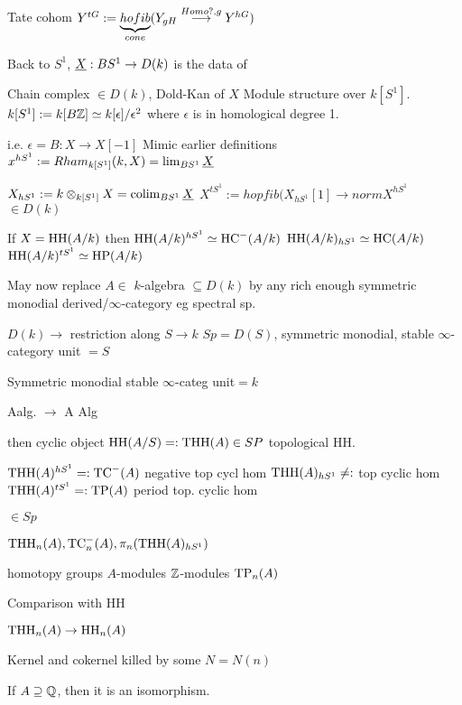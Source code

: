 Tate cohom
$Y^{tG}:= \underbrace{hofib}_{cone}(Y_{gH} \stackrel{Homo ?,g}{\longrightarrow} Y^{hG})$

Back to $S^1$, $\underline{X}: BS^1 \to D(k)$ is the data of 

Chain complex $\in D(k)$, Dold-Kan of $X$
Module structure over $k[S^1]$.
$k[S^1]:= k[B\mathbb{Z}] \simeq k[\epsilon]/\epsilon^2$
where $\epsilon$ is in homological degree 1.

i.e. $\epsilon=B: X \to X[-1]$
Mimic earlier definitions $x^{hS^1}:= Rham_{k[S^1]}(k,X) = \lim_{BS^1} \underline{X}$

$X_{hS^1}:= k \otimes_{k[S^1]} X= \operatorname{colim}_{BS^1} \underline{X}$
$X^{tS^1}:= hopfib(X_{hS^1}[1] \to norm X^{hS^1}$
$ \in D(k)$


If $X= \operatorname{HH}(A/k)$ then 
$\operatorname{HH}(A/k)^{hS^1} \simeq \operatorname{HC}^-(A/k)$
$\operatorname{HH}(A/k)_{hS^1} \simeq \operatorname{HC}(A/k)$
$\operatorname{HH}(A/k)^{tS^1} \simeq \operatorname{HP}(A/k)$

May now replace $A \in$ $k$-algebra $\subseteq D(k)$ by any rich enough symmetric monodial derived/$\infty$-category eg spectral sp.

$D(k) \to$ restriction along $S \to k$ $Sp=D(S)$, symmetric monodial, stable $\infty$-category unit $=S$

Symmetric monodial
stable $\infty$-categ
unit$=k$

Aalg. $\to$ A Alg


then cyclic object $\operatorname{HH}(A/S)=: \operatorname{THH}(A) \in SP$ topological HH. 

$\operatorname{THH}(A)^{hS^1}=: \operatorname{TC}^-(A)$ negative top cycl hom
$\operatorname{THH}(A)_{hS^1} \not=:$ top cyclic hom
$\operatorname{THH}(A)^{tS^1} =: \operatorname{TP}(A)$ period top. cyclic hom

$\in Sp$

$\operatorname{THH}_n(A), \operatorname{TC}_n^-(A), \pi_n(\operatorname{THH}(A)_{hS^1})$

homotopy groups
$A$-modules
$\mathbb{Z}$-modules
$\operatorname{TP}_n(A)$

Comparison with HH

$\operatorname{THH}_n(A) \to \operatorname{HH}_n(A)$

Kernel and cokernel killed by some $N= N(n)$

If $A \supseteq \mathbb{Q}$, then it is an isomorphism. 




























